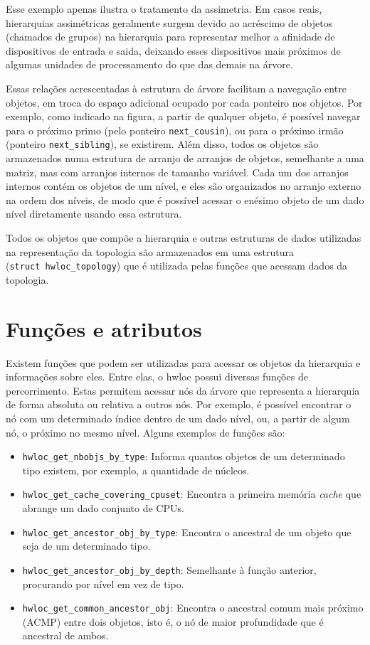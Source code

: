 Esse exemplo apenas ilustra o tratamento da assimetria.
Em casos reais, hierarquias assimétricas geralmente surgem devido ao acréscimo de objetos (chamados de grupos) na hierarquia para representar melhor a afinidade de dispositivos de entrada e saida,
deixando esses dispositivos mais próximos de algumas unidades de processamento do que das demais na árvore.

Essas relações acrescentadas à estrutura de árvore facilitam a navegação entre objetos, em troca do espaço adicional ocupado por cada ponteiro nos objetos.
Por exemplo, como indicado na figura, a partir de qualquer objeto, é possível navegar para o próximo primo (pelo ponteiro \texttt{next\_cousin}), ou para o próximo irmão (ponteiro \texttt{next\_sibling}), se existirem.
Além disso, todos os objetos são armazenados numa estrutura de arranjo de arranjos de objetos, semelhante a uma matriz, mas com arranjos internos de tamanho variável.
Cada um dos arranjos internos contém os objetos de um nível, e eles são organizados no arranjo externo na ordem dos níveis, de modo que é possível acessar o enésimo objeto de um dado nível diretamente usando essa estrutura.

Todos os objetos que compõe a hierarquia e outras estruturas de dados utilizadas na representação da topologia são armazenados em uma estrutura (\texttt{struct~hwloc\_topology}) que é utilizada pelas funções que acessam dados da topologia.


\section{Funções e atributos}

Existem funções que podem ser utilizadas para acessar os objetos da hierarquia e informações sobre eles.
Entre elas, o hwloc possui diversas funções de percorrimento.
Estas permitem acessar nós da árvore que representa a hierarquia de forma absoluta ou relativa a outros nós.
Por exemplo, é possível encontrar o nó com um determinado índice dentro de um dado nível,
ou, a partir de algum nó, o próximo no mesmo nível.
Alguns exemplos de funções são:
\begin{itemize}
	\item \texttt{hwloc\_get\_nbobjs\_by\_type}: Informa quantos objetos de um determinado tipo existem, por exemplo, a quantidade de núcleos.
	\item \texttt{hwloc\_get\_cache\_covering\_cpuset}: Encontra a primeira memória \textit{cache} que abrange um dado conjunto de CPUs.
	\item \texttt{hwloc\_get\_ancestor\_obj\_by\_type}: Encontra o ancestral de um objeto que seja de um determinado tipo.
	\item \texttt{\texttt{hwloc\_get\_ancestor\_obj\_by\_depth}}: Semelhante à função anterior, procurando por nível em vez de tipo.
	\item \texttt{hwloc\_get\_common\_ancestor\_obj}: Encontra o ancestral comum mais próximo (ACMP) entre dois objetos, isto é, o nó de maior profundidade que é ancestral de ambos.
\end{itemize}

